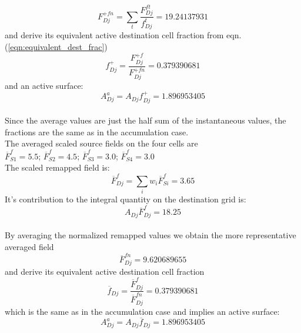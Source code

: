 \[F^{+fn}_{Dj}=\sum_t{\frac{F^{ft}_{Dj}}{f^t_{Dj}}}=19.24137931\]
and derive its equivalent active destination cell fraction from eqn. (\ref{eqn:equivalent_dest_frac})
\[f^+_{Dj} = \frac{F^{+f}_{Dj}}{F^{+fn}_{Dj}} = 0.379390681\]
and an active surface:
\[A^a_{Dj}=A_{Dj}f^+_{Dj}=1.896953405\]
\\
Since the average values are just the half sum of the instantaneous values, the fractions are the same as in the accumulation case.\\
The averaged scaled source fields on the four cells are\\
\(\overline{F}^{f}_{S1} = 5.5\);
\(\overline{F}^{f}_{S2} = 4.5\);
\(\overline{F}^{f}_{S3} = 3.0\);
\(\overline{F}^{f}_{S4} = 3.0\)\\
The scaled remapped field is:
\[\overline{F}^{f}_{Dj}=\sum_i{w_i\overline{F}^{f}_{Si}}=3.65\]
It's contribution to the integral quantity on the destination grid is:
\[A_{Dj}\overline{F}^{f}_{Dj} = 18.25\]
\\
By averaging the normalized remapped values we obtain the more representative averaged field
\[\overline{F}^{fn}_{Dj}=9.620689655\]
and derive its equivalent active destination cell fraction 
\[\overline{f}_{Dj} = \frac{\overline{F}^{f}_{Dj}}{\overline{F}^{fn}_{Dj}} = 0.379390681\]
which is the same as in the accumulation case and implies an active surface:
\[A^a_{Dj}=A_{Dj}\overline{f}_{Dj}=1.896953405\]


